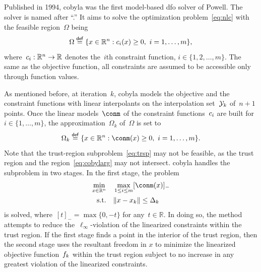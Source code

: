 \documentclass[
    smallextended,  %
    final,          %
]{svjour3}
\newcommand{\R}{\mathbb{R}}
\newcommand{\con}[1][i]{c\ifthenelse{\equal{#1}{}}{}{_{#1}}}
\newcommand{\eqdef}{\mathrel{\stackrel{\mathsf{def}}{=}}}
\newcommand{\fsetm}[1][k]{\Omega_{#1}}
\newcommand{\fset}{\Omega}
\newcommand{\iter}[1][k]{x\ifthenelse{\equal{#1}{}}{}{_{#1}}}
\newcommand{\norm}[2][]{#1\lVert#2#1\rVert}
\newcommand{\objm}[1][k]{\obj\ifthenelse{\equal{#1}{}}{}{_{#1}}}
\newcommand{\obj}{f}
\newcommand{\rad}[1][k]{\Delta\ifthenelse{\equal{#1}{}}{}{_{#1}}}
\newcommand{\set}[2][]{#1\{#2#1\}}
\newcommand{\st}{\text{s.t.}}
\newcommand{\xpt}[1][k]{\mathcal{Y}\ifthenelse{\equal{#1}{}}{}{_{#1}}}
\begin{document}
\subsection{}
\label{ssec:cobyla}

Published in 1994, \gls{cobyla} was the first model-based \gls{dfo} solver of Powell.
The solver is named after ``.''
It aims to solve the optimization problem~\eqref{eq:nlc} with the feasible region~$\fset$ being
\begin{equation*}
    \fset \eqdef \set{x \in \R^n : \con(x) \ge 0, ~ i = 1, \dots, m},
\end{equation*}
where~$\con : \R^n \to \R$ denotes the~$i$th constraint function, $i \in \set{1, 2, \dots, m}$.
The same as the objective function, all constraints are assumed to be accessible only through function values.

As mentioned before, at iteration~$k$, \gls{cobyla} models the objective and the constraint functions with {linear}
interpolants on the interpolation set~$\xpt$ of~$n + 1$ points.
Once the linear models~$\conm$ of the constraint functions~$\con$ are built for~$i \in \set{1, \dots, m}$, the approximation~$\fsetm$ of~$\fset$ is set to
\begin{equation}
    \label{eq:cobylarg}
    \fsetm \eqdef \set{x \in \R^n : \conm(x) \ge 0, ~ i=1, \dots, m}.
\end{equation}
Note that the trust-region subproblem~\eqref{eq:trsp} may not be feasible,
as the trust region and the region~\eqref{eq:cobylarg} may not intersect.
\gls{cobyla} handles the subproblem in two stages. In the first stage, the problem
\begin{equation}
    \label{eq:cobyla_sp1}
    \begin{split}
    \min_{x \in \R^n}   & \quad \max_{1 \le i \le m} [\conm(x)]_{-}\\
    \st                 & \quad \norm{x - \iter} \le \rad
    \end{split}
\end{equation}
is solved, where~$[t]_{-} = \max \set{0, -t}$ for any~$t\in \R$.
In doing so, the method attempts to reduce the~$\ell_{\infty}$-violation of the linearized constraints within the trust region.
If the first stage finds a point in the interior of the trust region,
then the second stage uses the resultant freedom in $x$ to minimize the linearized objective
function~$\objm$ within the trust region subject to no increase in any greatest violation of the
linearized constraints.
\end{document}
